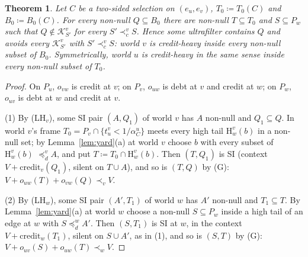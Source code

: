 \documentclass[11pt]{article}
\newtheorem{theorem}{Theorem}
\theoremstyle{definition}\newtheorem{definition}[theorem]{Definition}
\theoremstyle{remark}\newtheorem{remark}[theorem]{Remark}
\newcommand{\cred}{\mathrm{credit}}
\newcommand{\Kid}{\mathcal K}
\newcommand{\Hi}[3]{\mathrm H^{#1}_{#2}(#3)}
\begin{document}
\begin{theorem}\label{thm:dense}
Let $C$ be a two-sided selection on $(e_u,e_v)$, $T_0\coloneqq T_0(C)$ and
$B_0\coloneqq B_0(C)$. For every non-null $Q\subseteq B_0$ there are
non-null $T\subseteq T_0$ and $S\subseteq P_w$ such that $Q\notin\Kid^v_{S'}$
for every $S'\prec^v_cS$. Hence some ultrafilter contains $Q$ and avoids
every $\Kid^v_{S'}$ with $S'\prec^v_cS$: world $v$ is credit-heavy inside
every non-null subset of $B_0$. Symmetrically, world $u$ is credit-heavy in
the same sense inside every non-null subset of $T_0$.
\end{theorem}
\begin{proof}
On $P_u$, $o_{vw}$ is credit at $v$; on $P_v$, $o_{uw}$ is debt at $v$ and
credit at $w$; on $P_w$, $o_{uv}$ is debt at $w$ and credit at $v$.

(1) By (LH$_v$), some SI pair $(A,Q_1)$ of world $v$ has $A$ non-null and
$Q_1\subseteq Q$. In world $v$'s frame $T_0=P_v\cap\{t^v_u<1/\alpha^u_C\}$ meets
every high tail $\Hi vwb$ in a non-null set; by Lemma~\ref{lem:yard}(a) at
world $v$ choose $b$ with every subset of $\Hi vwb$ $\preceq^v_dA$, and put
$T\coloneqq T_0\cap\Hi vwb$. Then $(T,Q_1)$ is SI (context
$V+\cred_v(Q_1)$, silent on $T\cup A$), and so is $(T,Q)$ by (G):
$V+o_{uw}(T)+o_{vw}(Q)\prec_vV$.

(2) By (LH$_w$), some SI pair $(A',T_1)$ of world $w$ has $A'$ non-null and
$T_1\subseteq T$. By Lemma~\ref{lem:yard}(a) at world $w$ choose a non-null
$S\subseteq P_w$ inside a high tail of an edge at $w$ with $S\preceq^w_dA'$.
Then $(S,T_1)$ is SI at $w$, in the context $V+\cred_w(T_1)$, silent on
$S\cup A'$, as in (1), and so is $(S,T)$ by (G):
$V+o_{uv}(S)+o_{uw}(T)\prec_wV$.


\end{proof}
\end{document}
